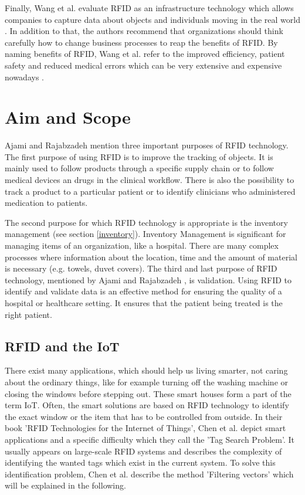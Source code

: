 Finally, Wang et al. evaluate RFID as an infrastructure technology which allows companies to capture data about objects and individuals moving in the real world \cite[p.7]{casestudy}. In addition to that, the authors recommend that organizations should think carefully how to change business processes to reap the benefits of RFID. By naming benefits of RFID, Wang et al. refer to the improved efficiency, patient safety and reduced medical errors which can be very extensive and expensive nowadays \cite{casestudy}.

\section{Aim and Scope} \label{aim}

Ajami and Rajabzadeh \cite{ncbi} mention three important purposes of RFID technology. The first purpose of using RFID is to improve the tracking of objects. It is mainly used to follow products through a specific supply chain or to follow medical devices an drugs in the clinical workflow. There is also the possibility to track a product to a particular patient or to identify clinicians who administered medication to patients.

The second purpose for which RFID technology is appropriate is the inventory management (see section \ref{inventory}). Inventory Management is significant for managing items of an organization, like a hospital. There are many complex processes where information about the location, time and the amount of material is necessary (e.g. towels, duvet covers).
The third and last purpose of RFID technology, mentioned by Ajami and Rajabzadeh \cite{ncbi}, is validation. Using RFID to identify and validate data is an effective method for ensuring the quality of a hospital or healthcare setting. It ensures that the patient being treated is the right patient.

\subsection{RFID and the IoT}

There exist many applications, which should help us living smarter, not caring about the ordinary things, like for example turning off the washing machine or closing the windows before stepping out. These smart houses form a part of the term \ac{IoT}. Often, the smart solutions are based on RFID technology to identify the exact window or the item that has to be controlled from outside. 
In their book 'RFID Technologies for the Internet of Things', Chen et al. \cite[p.2 f.]{chen} depict smart applications and a specific difficulty which they call the 'Tag Search Problem'. It usually appears on large-scale RFID systems and describes the complexity of identifying the wanted tags which exist in the current system. To solve this identification problem, Chen et al. describe the method 'Filtering vectors' which will be explained in the following. 

